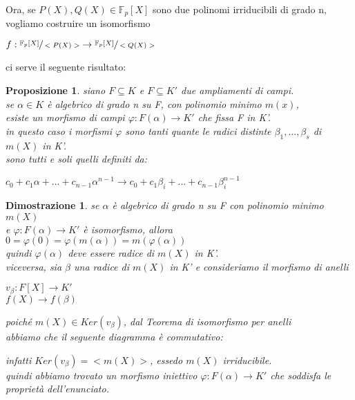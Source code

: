 \documentclass[a4paper,12pt]{article}
\theoremstyle{def}
\theoremstyle{prop}
\newtheorem*{proposition}{Proposizione}
\theoremstyle{esempio}
\theoremstyle{dimostrazione}
\newtheorem*{dimostrazione}{Dimostrazione}
\theoremstyle{teo}
\theoremstyle{osservazione}
\begin{document}
\newpage

Ora, se \(P(X), Q(X) \in \mathbb{F}_p[X]\) sono due polinomi irriducibili di grado n,\\
vogliamo costruire un isomorfismo 
\begin{center}
	\(f: \sfrac{\mathbb{F}_p[X]}{<P(X)>} \rightarrow \sfrac{\mathbb{F}_p[X]}{<Q(X)>}\)
\end{center}
ci serve il seguente risultato:

\begin{proposition}
	siano \(F \subseteq K\) e \(F \subseteq K'\) due ampliamenti di campi.\\
	se \(\alpha \in K\) è algebrico di grado n su F, con polinomio minimo \(m(x)\),\\
	esiste un morfismo di campi \(\varphi : F(\alpha) \rightarrow K'\) che fissa F in K'.\\
	in questo caso i morfismi \(\varphi\) sono tanti quante le radici distinte \(\beta_1, ... ,\beta_s\) di \(m(X)\) in K'.\\
	sono tutti e soli quelli definiti da:
	\begin{center}
		\(c_0 + c_1\alpha + ... + c_{n-1}\alpha^{n-1} \rightarrow c_0 + c_1\beta_i + ... + c_{n-1}\beta_i^{n-1} \)
	\end{center}
\end{proposition}

\begin{dimostrazione}
	se \(\alpha\) è algebrico di grado n su F con polinomio minimo \(m(X)\)\\
	e \(\varphi : F(\alpha) \rightarrow K'\) è isomorfismo, allora \(0 = \varphi(0) = \varphi(m(\alpha)) = m(\varphi(\alpha))\)\\
	quindi \(\varphi(\alpha)\) deve essere radice di \(m(X)\) in K'.\\
	viceversa, sia \(\beta\) una radice di \(m(X)\) in K' e consideriamo il morfismo di anelli\\
	\begin{center}
		\(v_\beta : F[X] \rightarrow K'\)\\
		\(f(X) \rightarrow f(\beta)\)
	\end{center}
	poiché \(m(X) \in Ker(v_\beta)\), dal Teorema di isomorfismo per anelli\\
	abbiamo che il seguente diagramma è commutativo:\\
	\begin{center}
	\end{center}
	infatti \(Ker(v_\beta) = <m(X)>\), essedo \(m(X)\) irriducibile.\\
	quindi abbiamo trovato un morfismo iniettivo \(\varphi : F(\alpha) \rightarrow K'\) che soddisfa le proprietà dell'enunciato.\\
\end{dimostrazione}
\end{document}
